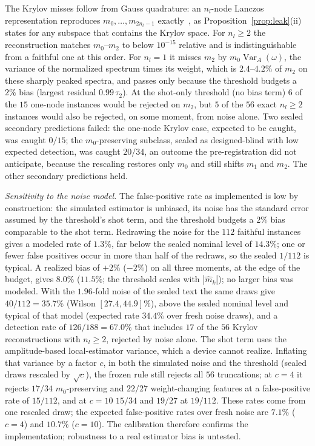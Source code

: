 \documentclass[submission, PhysCore]{SciPost}
\begin{document}
The Krylov misses follow from Gauss quadrature: an $n_l$-node Lanczos representation reproduces $m_0,\dots,m_{2n_l-1}$ exactly~\cite{GolubWelsch1969,GM2010}, as Proposition~\ref{prop:leak}(ii) states for any subspace that contains the Krylov space. For $n_l\ge2$ the reconstruction matches $m_0$--$m_2$ to below $10^{-15}$ relative and is indistinguishable from a faithful one at this order. For $n_l=1$ it misses $m_2$ by $m_0\operatorname{Var}_A(\omega)$, the variance of the normalized spectrum times its weight, which is $2.4$--$4.2\%$ of $m_2$ on these sharply peaked spectra, and passes only because the threshold budgets a $2\%$ bias (largest residual $0.99\,\tau_2$). At the shot-only threshold (no bias term) $6$ of the $15$ one-node instances would be rejected on $m_2$, but $5$ of the $56$ exact $n_l\ge2$ instances would also be rejected, on some moment, from noise alone. Two sealed secondary predictions failed: the one-node Krylov case, expected to be caught, was caught $0/15$; the $m_0$-preserving subclass, sealed as designed-blind with low expected detection, was caught $20/34$, an outcome the pre-registration did not anticipate, because the rescaling restores only $m_0$ and still shifts $m_1$ and $m_2$. The other secondary predictions held.

\emph{Sensitivity to the noise model.} The false-positive rate as implemented is low by construction: the simulated estimator is unbiased, its noise has the standard error assumed by the threshold's shot term, and the threshold budgets a $2\%$ bias comparable to the shot term. Redrawing the noise for the $112$ faithful instances gives a modeled rate of $1.3\%$, far below the sealed nominal level of $14.3\%$; one or fewer false positives occur in more than half of the redraws, so the sealed $1/112$ is typical. A realized bias of $+2\%$ ($-2\%$) on all three moments, at the edge of the budget, gives $8.0\%$ ($11.5\%$; the threshold scales with $|\widehat m_k|$); no larger bias was modeled. With the $1.96$-fold noise of the sealed text the same draws give $40/112=35.7\%$ (Wilson $[27.4,44.9]\%$), above the sealed nominal level and typical of that model (expected rate $34.4\%$ over fresh noise draws), and a detection rate of $126/188=67.0\%$ that includes $17$ of the $56$ Krylov reconstructions with $n_l\ge2$, rejected by noise alone. The shot term uses the amplitude-based local-estimator variance, which a device cannot realize. Inflating that variance by a factor $c$, in both the simulated noise and the threshold (sealed draws rescaled by $\sqrt c$), the frozen rule still rejects all $56$ truncations; at $c=4$ it rejects $17/34$ $m_0$-preserving and $22/27$ weight-changing features at a false-positive rate of $15/112$, and at $c=10$ $15/34$ and $19/27$ at $19/112$. These rates come from one rescaled draw; the expected false-positive rates over fresh noise are $7.1\%$ ($c=4$) and $10.7\%$ ($c=10$). The calibration therefore confirms the implementation; robustness to a real estimator bias is untested.
\end{document}
